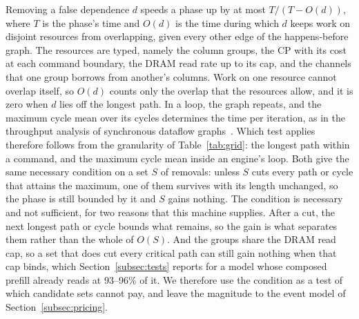 Removing a false dependence $d$ speeds a phase up by at most $T / (T - O(d))$, where $T$ is the phase's time and $O(d)$ is the time during which $d$ keeps work on disjoint resources from overlapping, given every other edge of the happens-before graph.
The resources are typed, namely the column groups, the CP with its cost at each command boundary, the DRAM read rate up to its cap, and the channels that one group borrows from another's columns.
Work on one resource cannot overlap itself, so $O(d)$ counts only the overlap that the resources allow, and it is zero when $d$ lies off the longest path.
In a loop, the graph repeats, and the maximum cycle mean over its cycles determines the time per iteration, as in the throughput analysis of synchronous dataflow graphs~\citep{ghamarian2006throughput}.
Which test applies therefore follows from the granularity of Table~\ref{tab:grid}: the longest path within a command, and the maximum cycle mean inside an engine's loop.
Both give the same necessary condition on a set $S$ of removals: unless $S$ cuts every path or cycle that attains the maximum, one of them survives with its length unchanged, so the phase is still bounded by it and $S$ gains nothing.
The condition is necessary and not sufficient, for two reasons that this machine supplies.
After a cut, the next longest path or cycle bounds what remains, so the gain is what separates them rather than the whole of $O(S)$.
And the groups share the DRAM read cap, so a set that does cut every critical path can still gain nothing when that cap binds, which Section~\ref{subsec:tests} reports for a model whose composed prefill already reads at 93--96\% of it.
We therefore use the condition as a test of which candidate sets cannot pay, and leave the magnitude to the event model of Section~\ref{subsec:pricing}.
